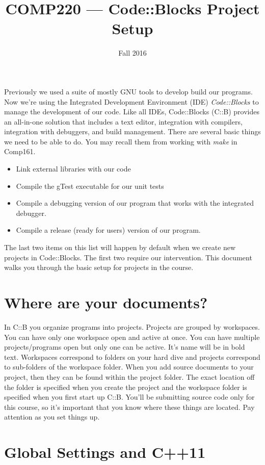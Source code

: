 \documentclass[10pt]{article}
\title{COMP220 --- Code::Blocks Project Setup}
\author{ }
\date{Fall 2016}
\begin{document}
\maketitle

Previously we used a suite of mostly GNU tools to develop build our programs.  Now we're using the Integrated Development Environment (IDE) \textit{Code::Blocks} to manage the development of our code. Like all IDEs, Code::Blocks (C::B) provides an all-in-one solution that includes a text editor, integration with compilers, integration with debuggers, and build management. There are several basic things we need to be able to do.  You may recall them from working with \textit{make} in Comp161.
\begin{itemize}
\item Link external libraries with our code
\item Compile the gTest executable for our unit tests
\item Compile a debugging version of our program that works with the integrated debugger.
\item Compile a release (ready for users) version of our program.
\end{itemize}
The last two items on this list will happen by default when we create new projects in Code::Blocks. The first two require our intervention. This document walks you through the basic setup for projects in the course.

\section{Where are your documents?}

In C::B you organize programs into projects. Projects are grouped by workspaces. You can have only one workspace open and active at once. You can have multiple projects/programs open but only one can be active. It's name will be in bold text. Workspaces correspond to folders on your hard dive and projects correspond to sub-folders of the workspace folder. When you add source documents to your project, then they can be found within the project folder. The exact location off the folder is specified when you create the project and the workspace folder is specified when you first start up C::B. You'll be submitting source code only for this course, so it's important that you know where these things are located. Pay attention as you set things up.

\section{Global Settings and C++11}
\end{document}
